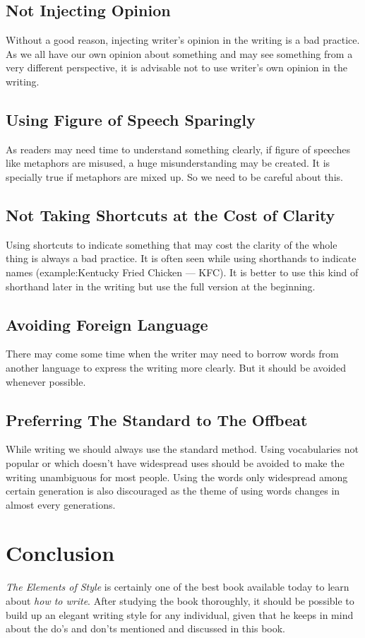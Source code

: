 \documentclass[12pt]{report}
\begin{document}
\section{Not Injecting Opinion}
Without a good reason, injecting writer's opinion in the writing is a bad practice. As we all have our own opinion about something and may see something from a very different perspective, it is advisable not to use writer's own opinion in the writing.


\section{Using Figure of Speech Sparingly}
As readers may need time to understand something clearly, if figure of speeches like metaphors are misused, a huge misunderstanding may be created. It is specially true if metaphors are mixed up. So we need to be careful about this.


\section{Not Taking Shortcuts at the Cost of Clarity}
Using shortcuts to indicate something that may cost the clarity of the whole thing is always a bad practice. It is often seen while using shorthands to indicate names (example:Kentucky Fried Chicken --- KFC). It is better to use this kind of shorthand later in the writing but use the full version at the beginning.


\section{Avoiding Foreign Language}
There may come some time when the writer may need to borrow words from another language to express the writing more clearly. But it should be avoided whenever possible. 


\section{Preferring The Standard to The Offbeat}
While writing we should always use the standard method. Using vocabularies not popular or which doesn't have widespread uses should be avoided to make the writing unambiguous for most people. Using the words only widespread among certain generation is also discouraged as the theme of using words changes in almost every generations.



\chapter{Conclusion}
\textit{The Elements of Style} is certainly one of the best book available today to learn about \textit{how to write}. After studying the book thoroughly, it should be possible to build up an elegant writing style for any individual, given that he keeps in mind about the do's and don'ts mentioned and discussed in this book.
\end{document}
